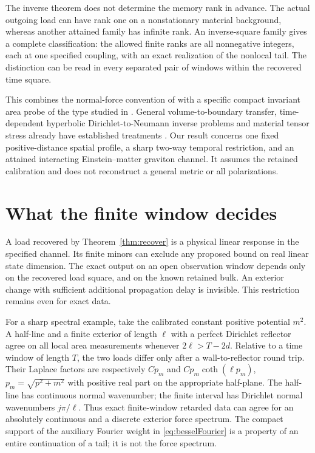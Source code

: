 \documentclass[11pt]{article}
\numberwithin{equation}{section}
\begin{document}
The inverse theorem does not determine the memory rank in advance. The actual outgoing load can have rank one on a nonstationary material background, whereas another attained family has infinite rank. An inverse-square family gives a complete classification: the allowed finite ranks are all nonnegative integers, each at one specified coupling, with an exact realization of the nonlocal tail. The distinction can be read in every separated pair of windows within the recovered time square.

This combines the normal-force convention of \cite{P44} with a specific compact invariant area probe of the type studied in \cite{P47,Khavkine}. General volume-to-boundary transfer, time-dependent hyperbolic Dirichlet-to-Neumann inverse problems and material tensor stress already have established treatments \cite{BLOS,Kian,ENW}. Our result concerns one fixed positive-distance spatial profile, a sharp two-way temporal restriction, and an attained interacting Einstein--matter graviton channel. It assumes the retained calibration and does not reconstruct a general metric or all polarizations.






\section{What the finite window decides}
A load recovered by Theorem~\ref{thm:recover} is a physical linear response in the specified channel. Its finite minors can exclude any proposed bound on real linear state dimension. The exact output on an open observation window depends only on the recovered load square, and on the known retained bulk. An exterior change with sufficient additional propagation delay is invisible. This restriction remains even for exact data.

For a sharp spectral example, take the calibrated constant positive potential \(m^2\). A half-line and a finite exterior of length \(\ell\) with a perfect Dirichlet reflector agree on all local area measurements whenever \(2\ell>T-2d\). Relative to a time window of length \(T\), the two loads differ only after a wall-to-reflector round trip. Their Laplace factors are respectively \(C p_m\) and \(C p_m\coth(\ell p_m)\), \(p_m=\sqrt{p^2+m^2}\) with positive real part on the appropriate half-plane. The half-line has continuous normal wavenumber; the finite interval has Dirichlet normal wavenumbers \(j\pi/\ell\). Thus exact finite-window retarded data can agree for an absolutely continuous and a discrete exterior force spectrum. The compact support of the auxiliary Fourier weight in \eqref{eq:besselFourier} is a property of an entire continuation of a tail; it is not the force spectrum.
\end{document}
